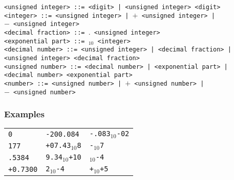 \documentclass[a4paper,11pt]{article}
\begin{document}
\begin{flushleft}
\vspace{0.2em}\texttt{<unsigned integer> ::= <digit> | <unsigned integer> <digit>}\\

\vspace{0.2em}\texttt{<integer> ::= <unsigned integer> | $+$ <unsigned integer> |\\
  \hspace{1.0cm}$-$ <unsigned integer>}\\

\vspace{0.2em}\texttt{<decimal fraction> ::= $.$ <unsigned integer>}\\

\vspace{0.2em}\texttt{<exponential part> ::= $_{10}$ <integer>}\\

\vspace{0.2em}\texttt{<decimal number> ::= <unsigned integer> | <decimal fraction> | \\
  \hspace{1.0cm}<unsigned integer> <decimal fraction>}\\

\vspace{0.2em}\texttt{<unsigned number> ::= <decimal number> | <exponential part> |\\
  \hspace{1.0cm}<decimal number> <exponential part>}\\

\vspace{0.2em}\texttt{<number> ::= <unsigned number> | $+$ <unsigned number> |\\
  \hspace{1.0cm}$-$ <unsigned number>}\\
\end{flushleft}


\subsubsection{Examples}

\begin{tabular*}{16.0cm}{lll}
\texttt{0}       &\texttt{-200.084}       &\texttt{-.083$_{10}$-02} \\
\texttt{177}     &\texttt{+07.43$_{10}$8} &\texttt{-$_{10}$7}       \\
\texttt{.5384}   &\texttt{9.34$_{10}$+10} &\texttt{$_{10}$-4}       \\
\texttt{+0.7300} &\texttt{2$_{10}$-4}     &\texttt{+$_{10}$+5}      \\
\end{tabular*}
\end{document}
